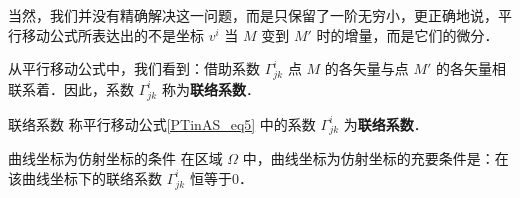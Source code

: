当然，我们并没有精确解决这一问题，而是只保留了一阶无穷小，更正确地说，平行移动公式所表达出的不是坐标 $v^i$ 当 $M$ 变到 $M'$ 时的增量，而是它们的微分．

从平行移动公式中，我们看到：借助系数 $\Gamma^i_{jk}$ 点 $M$ 的各矢量与点 $M'$ 的各矢量相联系着．因此，系数 $\Gamma^i_{jk}$ 称为\textbf{联络系数}．
\begin{definition}{联络系数}
称平行移动公式\autoref{PTinAS_eq5} 中的系数 $\Gamma^i_{jk}$ 为\textbf{联络系数}．
\end{definition}
\begin{theorem}{曲线坐标为仿射坐标的条件}
在区域 $\Omega$ 中，曲线坐标为仿射坐标的充要条件是：在该曲线坐标下的联络系数 $\Gamma^i_{jk}$ 恒等于0．
\end{theorem}